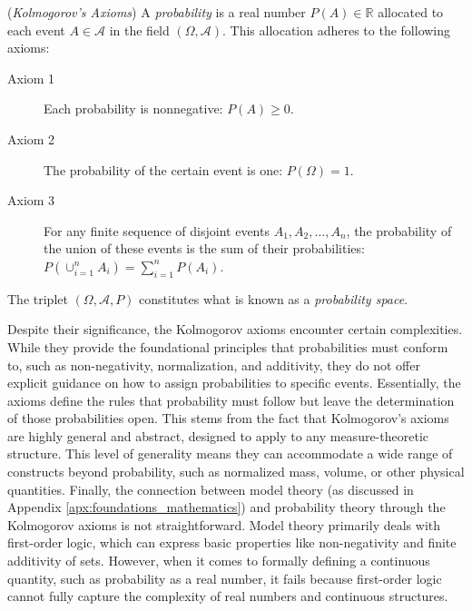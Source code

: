 \begin{definition} (\emph{Kolmogorov's Axioms})\label{Kolmogorov_axioms}
A \emph{probability} is a real number $P(A) \in \mathbb{R}$ allocated to each event $A \in \mathcal{A}$ in the field $\left( \Omega, \mathcal{A} \right)$. This allocation adheres to the following axioms:

\medskip

\begin{description}
\item [Axiom 1] Each probability is nonnegative: $P(A) \geq 0$.
\item [Axiom 2] The probability of the certain event is one: $P(\Omega) = 1$.
\item [Axiom 3] For any finite sequence of disjoint events $A_1, A_2, \ldots, A_n$, the probability of the union of these events is the sum of their probabilities: $P(\cup_{i=1}^n A_i) = \sum_{i=1}^n P(A_i)$.
\end{description}

The triplet $\left( \Omega, \mathcal{A}, P \right)$ constitutes what is known as a \emph{probability space}.
\end{definition}

Despite their significance, the Kolmogorov axioms encounter certain complexities. While they provide the foundational principles that probabilities must conform to, such as non-negativity, normalization, and additivity, they do not offer explicit guidance on how to assign probabilities to specific events. Essentially, the axioms define the rules that probability must follow but leave the determination of those probabilities open. This stems from the fact that Kolmogorov's axioms are highly general and abstract, designed to apply to any measure-theoretic structure. This level of generality means they can accommodate a wide range of constructs beyond probability, such as normalized mass, volume, or other physical quantities. Finally, the connection between model theory (as discussed in Appendix \ref{apx:foundations_mathematics}) and probability theory through the Kolmogorov axioms is not straightforward. Model theory primarily deals with first-order logic, which can express basic properties like non-negativity and finite additivity of sets. However, when it comes to formally defining a continuous quantity, such as probability as a real number, it fails because first-order logic cannot fully capture the complexity of real numbers and continuous structures.


